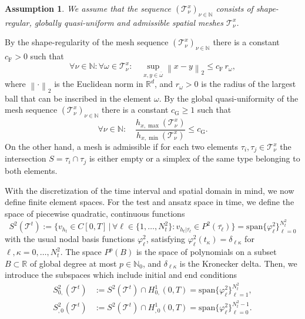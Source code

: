 \documentclass[a4paper,11pt]{article}
\newtheorem{assumption}[theorem]{Assumption}
\newcommand{\N}{\mathbb N}
\newcommand{\R}{\mathbb R}
\newcommand{\norm}[1]{{\left\lVert{#1}\right\rVert}}
\begin{document}
\begin{assumption} \label{A:Assumptions_mesh}
	We assume that the sequence $( \mathcal T^x_\nu )_{\nu \in \N}$ consists of shape-regular, globally quasi-uniform and admissible spatial meshes $\mathcal T^x_\nu$. 
\end{assumption}

 By the shape-regularity of the mesh sequence $( \mathcal T^x_\nu )_{\nu \in \N}$  there is a constant $c_\mathrm F > 0$ such that
\begin{equation} \label{FES:formregular}
	\forall \nu \in \N: \forall \omega \in \mathcal T^x_\nu: \quad \sup_{x,y \in \overline{\omega} } \norm{x - y}_2 \leq c_\mathrm F\, r_\omega,
\end{equation}
where  $\norm{\cdot}_2$ is the Euclidean norm in $\R^d$, and $r_\omega >0$ is the radius of the largest ball that can be inscribed in the element $\omega$.  By the global quasi-uniformity of the mesh sequence $(\mathcal T^x_\nu)_{\nu \in \N}$   there is a constant $c_\mathrm G \geq 1$ such that
\begin{equation*}
	\forall \nu \in \N\colon \quad \frac{h_{x,\max}(\mathcal T^x_\nu)}{h_{x,\min}(\mathcal T^x_\nu)} \leq c_\mathrm G.
\end{equation*}
 On the other hand, a mesh is admissible if for each two elements $\tau_i,\tau_j\in \mathcal T^x_\nu$ the intersection $S = \tau_i\cap \tau_j$ is either empty or a simplex of the same type belonging to both elements.

With the discretization of the time interval and spatial domain in mind, we now define finite element spaces. For the test and ansatz space in time, we define the space of piecewise quadratic, continuous functions
\begin{equation*}
	S^2(\mathcal T^t) := \Big\{ v_{h_t} \in C[0,T]\, |\, \forall \ell \in \{ 1, \dots, N_t^2 \}: v_{h_t|\overline{\tau_\ell}} \in P^2(\overline{\tau_\ell})  \Big\}  = \mathrm{span} \{\varphi^2_\ell\}_{\ell=0}^{N_t^2}
\end{equation*}
with the usual nodal basis functions $\varphi^2_\ell$, satisfying $\varphi^2_\ell(t_\kappa)=\delta_{\ell \kappa}$ for $\ell,\kappa=0,\dots, N_t^2$. The space $P^p(B)$ is the space of polynomials on a subset $B \subset \R$ of global degree at most $p \in \N_0$, and $\delta_{\ell \kappa}$ is the Kronecker delta. Then, we introduce the subspaces which include initial and end conditions
\begin{align*}
	S_{0,}^2(\mathcal T^t) &:= S^2(\mathcal T^t) \cap H^1_{0,}(0,T) = \mathrm{span} \{\varphi^2_\ell\}_{\ell=1}^{N_t^2}, \\
	S_{,0}^2(\mathcal T^t) &:= S^2(\mathcal T^t) \cap H^1_{,0}(0,T) = \mathrm{span} \{\varphi^2_\ell\}_{\ell=0}^{N_t^2-1}.
\end{align*}
\end{document}
